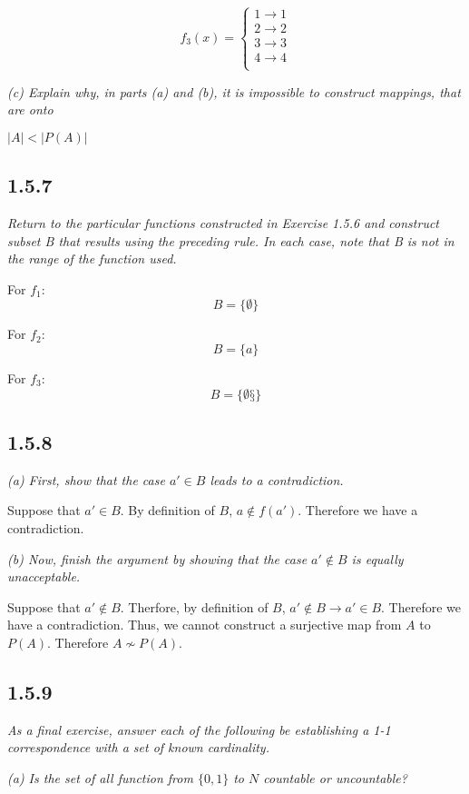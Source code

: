 \documentclass[11pt,oneside,titlepage]{book}
\begin{document}
\begin{equation}
  f_3(x) =
  \begin{cases}
    1 \to {1} \\
    2 \to {2} \\
    3 \to {3} \\
    4 \to {4} \\
  \end{cases}    
\end{equation}

\textit{(c) Explain why, in parts (a) and (b), it is impossible to construct mappings,
  that are onto}

$|A| < |P(A)|$

\subsection*{1.5.7}
\textit{Return to the particular functions constructed in Exercise 1.5.6 and construct
  subset B that results using the preceding rule. In each case, note that B is not in
  the range of the function used. }

For $f_1$:
$$B = \{\emptyset\}$$

For $f_2$:
$$B = \{a\}$$

For $f_3$:
$$B = \{\emptyset§\}$$

\subsection*{1.5.8}
\textit{(a) First, show that the case $a' \in B$ leads to a contradiction.}

Suppose that $a' \in B$. By definition of $B$,  $a \notin f(a')$. Therefore we have a
contradiction.

\textit{(b) Now, finish the argument by showing that the case $a' \notin B$ is
  equally unacceptable.}

Suppose that $a' \notin B$. Therfore, by definition of $B$, $a' \notin B \to a' \in B$.
Therefore we have a contradiction. Thus, we cannot construct a surjective map from $A$ to
$P(A)$. Therefore $A \not\sim P(A)$.

\subsection*{1.5.9}
\textit{As a final exercise, answer each of the following be establishing a 1-1
  correspondence with a set of known cardinality.}

\textit{(a) Is the set of all function from $\{0, 1\}$ to $N$ countable or
  uncountable?}
\end{document}
